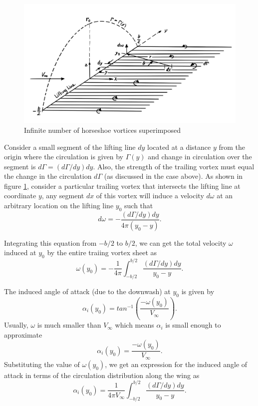 \documentclass[letterpaper,12pt]{article}
\begin{document}
\begin{figure}[h]
\includegraphics[scale=0.35]{3.2_infinite_vortices}
\centering
\caption{Infinite number of horseshoe vortices superimposed}
\label{3.2}
\end{figure}

Consider a small segment of the lifting line $dy$ located at a distance $y$ from the origin where the circulation is given by $\Gamma(y)$ and change in circulation over the segment is $d\Gamma = (d\Gamma/dy)dy$. Also, the strength of the trailing vortex must equal the change in the circulation $d\Gamma$ (as discussed in the case above). As shown in figure \ref{3.2}, consider a particular trailing vortex that intersects the lifting line at coordinate $y$, any segment $dx$ of this vortex will induce a velocity $d\omega$ at an arbitrary location on the lifting line $y_0$ such that
\begin{equation}
d\omega = -\frac{(d\Gamma/dy)dy}{4\pi(y_0-y)}.
\end{equation}

Integrating this equation from $-b/2$ to $b/2$, we can get the total velocity $\omega$ induced at $y_0$ by the entire traiing vortex sheet as
\begin{equation}
\omega(y_0) = -\frac{1}{4\pi}\int_{-b/2}^{b/2} \frac{(d\Gamma/dy)dy}{y_0-y}.
\end{equation}

The induced angle of attack (due to the downwash) at $y_0$ is given by
\begin{equation}
\alpha_i(y_0) = tan^{-1} \left(\frac{-\omega(y_0)}{V_\infty}\right).
\end{equation}
Usually, $\omega$ is much smaller than $V_\infty$ which means $\alpha_i$ is small enough to approximate
\begin{equation}
\alpha_i(y_0) = \frac{-\omega(y_0)}{V_\infty}.
\end{equation}
Substituting the value of $\omega(y_0)$, we get an expression for the induced angle of attack in terms of the circulation distribution along the wing as
\begin{equation}
\boxed{
\alpha_i(y_0) = \frac{1}{4\pi V_\infty}\int_{-b/2}^{b/2}\frac{(d\Gamma/dy)dy}{y_0-y}.
}
\label{indAOA}
\end{equation}
\end{document}

